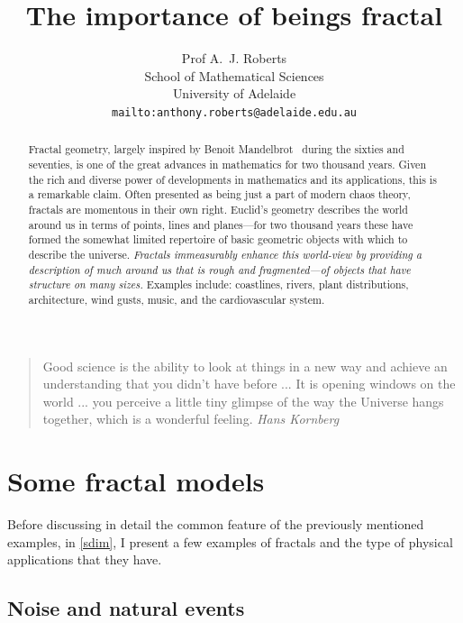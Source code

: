 \documentclass[12pt]{article}
\title{The importance of beings fractal}
\author{Prof A.~J. Roberts\\
School of Mathematical Sciences\\
University of Adelaide\\
\texttt{mailto:anthony.roberts@adelaide.edu.au}
}
\let\ltxsect\section
\renewcommand{\section}{\newpage\ltxsect}
\begin{document}
\maketitle

\newpage

\begin{quote}
	Good science is the ability to look at things in a new way and 
	achieve an understanding that you didn't have before ... It is opening 
	windows on the world ... you perceive a little tiny glimpse of the way 
	the Universe hangs together, which is a wonderful feeling.  \emph{Hans 
	Kornberg}~\cite{Korny}
\end{quote}

\newpage

\begin{abstract}
	Fractal geometry, largely inspired by Benoit 
	Mandelbrot~\cite{Mandel} during the sixties and seventies, is one 
	of the great advances in mathematics for two thousand years.  
	Given the rich and diverse power of developments in mathematics 
	and its applications, this is a remarkable claim.  Often presented 
	as being just a part of modern chaos theory, fractals are 
	momentous in their own right.  Euclid's geometry describes the 
	world around us in terms of points, lines and planes---for two 
	thousand years these have formed the somewhat limited repertoire 
	of basic geometric objects with which to describe the universe.  
	\emph{Fractals immeasurably enhance this world-view by providing a 
	description of much around us that is rough and fragmented---of 
	objects that have structure on many sizes.} Examples include: 
	coastlines, rivers, plant distributions, architecture, wind gusts, 
	music, and the cardiovascular system.
\end{abstract}

\newpage


\tableofcontents

\section{Some fractal models}
\label{sfrac}

Before discussing in detail the common feature of the previously 
mentioned examples, in \cref{sdim}, I present a few examples of 
fractals and the type of physical applications that they have.

\newpage

\subsection{Noise and natural events}
\label{ssnoise}
\end{document}
